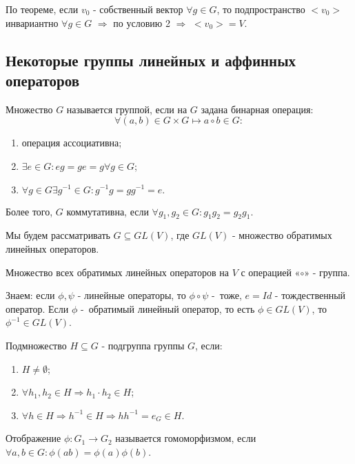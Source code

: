 По теореме, если $v_0$ - собственный вектор $\forall g \in G$, то подпространство $<v_0>$ инвариантно $\forall g \in G$ $\Longrightarrow$ по условию 2 $\Longrightarrow$ $<v_0> = V$.


\subsection{Некоторые группы линейных и аффинных операторов}
\begin{definition}
    Множество $G$ называется группой, если на $G$ задана бинарная операция:
    \[\forall (a,b) \in G \times G \longmapsto  a \circ b \in G:\]
    \begin{enumerate}
        \item операция ассоциативна;
        \item $\exists e \in G: eg = ge = g \forall g \in G$;
        \item $\forall g \in G \exists g^{-1} \in G: g^{-1}g = gg^{-1} = e.$
    \end{enumerate}
    Более того, $G$ коммутативна, если $\forall g_1, g_2 \in G: g_1g_2 = g_2g_1$.
\end{definition}

Мы будем рассматривать $G \subseteq GL(V)$, где $GL(V)$ - множество обратимых линейных операторов.
\begin{example1}
    Множество всех обратимых линейных операторов на $V$ с операцией «$\circ$» - группа.

    Знаем: если $\phi, \psi$ - линейные операторы, то $\phi \circ \psi$ - тоже, $e = Id$ - тождественный оператор. Если $\phi$ - обратимый линейный оператор, то есть $\phi \in GL(V)$, то $\phi^{-1} \in GL(V)$.
\end{example1}

\begin{definition}
    Подмножество $H \subseteq G$ - подгруппа группы $G$, если:
    \begin{enumerate}
        \item $H \neq \emptyset$;
        \item $\forall h_1, h_2 \in H \Longrightarrow h_1 \cdot h_2 \in H$;
        \item $\forall h \in H \Longrightarrow h^{-1} \in H \Longrightarrow h h^{-1} = e_G \in H$.
    \end{enumerate}
\end{definition} 

\begin{definition}
    Отображение $\phi: G_1 \to G_2$ называется гомоморфизмом, если $\forall a,b \in G: \phi(ab) = \phi(a)\phi(b)$.
\end{definition} 

